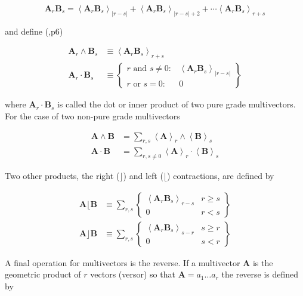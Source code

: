 \documentclass[12pt]{report}
\newcommand{\bm}[1]{\boldsymbol{#1}}
\newcommand{\llt}{\left <}
\newcommand{\rgt}{\right >}
\newcommand{\abs}[1]{\left |{#1}\right |}
\newcommand{\W}{\wedge}
\newcommand{\proj}[2]{\llt {#1} \rgt_{#2}}
\newcommand{\braces}[1]{\left \{ {#1} \right \}}
\begin{document}
   \begin{equation}
      \bm{A}_{r}\bm{B}_{s} = \proj{\bm{A}_{r}\bm{B}_{s}}{\abs{r-s}}+\proj{\bm{A}_{r}\bm{B}_{s}}{\abs{r-s}+2}+\cdots
                             \proj{\bm{A}_{r}\bm{B}_{s}}{r+s}
   \end{equation}

and define (\cite{Hestenes},p6)

   \begin{align}
      \bm{A}_{r}\W\bm{B}_{s} &\equiv \proj{\bm{A}_{r}\bm{B}_{s}}{r+s} \\
      \bm{A}_{r}\cdot\bm{B}_{s} &\equiv \braces{ \begin{array}{cc}
      r\mbox{ and }s \ne 0: & \proj{\bm{A}_{r}\bm{B}_{s}}{\abs{r-s}}  \\
      r\mbox{ or }s = 0: & 0 \end{array}}
   \end{align}

where $\bm{A}_{r}\cdot\bm{B}_{s}$ is called the dot or inner product of
two pure grade multivectors.  For the case of two non-pure grade multivectors

   \begin{align}
      \bm{A}\W\bm{B} &= \sum_{r,s}\proj{\bm{A}}{r}\W\proj{\bm{B}}{{s}} \\
      \bm{A}\cdot\bm{B} &= \sum_{r,s\ne 0}\proj{\bm{A}}{r}\cdot\proj{\bm{B}}{{s}}
   \end{align}

Two other products, the right ($\rfloor$) and left ($\lfloor$) contractions, are defined by

   \begin{align}
      \bm{A}\lfloor\bm{B} &\equiv \sum_{r,s}\braces{\begin{array}{cc} \proj{\bm{A}_r\bm{B}_{s}}{r-s} & r \ge s \\
                                                  0                                               & r < s \end{array}}  \\
      \bm{A}\rfloor\bm{B} &\equiv \sum_{r,s}\braces{\begin{array}{cc} \proj{\bm{A}_{r}\bm{B}_{s}}{s-r} & s \ge r \\
                                                  0                                               & s < r\end{array}}
   \end{align}

A final operation for multivectors is the reverse.  If a multivector $\bm{A}$ is the geometric product of $r$ vectors (versor)
so that $\bm{A} = a_{1}\dots a_{r}$ the reverse is defined by
\end{document}
